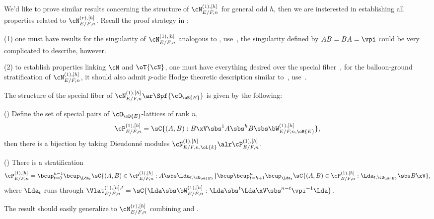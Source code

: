 \documentclass[article, a4paper, twoside]{universal}
\begin{document}
\begin{rmk}
	We'd like to prove similar results concerning the structure of $\cN_{E/F,n}^{(1),[h]}$ for general odd $h$, then we are insterested in establishing all properties related to $\cN_{E/F,n}^{(r),[h]}$. Recall the proof strategy in \cite{LRZ2024Quasi}:

	(1) one must have results for the singularity of $\cN_{E/F,n}^{(1),[h]}$ analogous to \cite[Proposition~14.2.4]{LRZ2024Quasi}, use~\cite[4.4.5]{Gortz2001}, the singularity defined by $AB=BA=\vpi$ could be very complicated to describe, however.

	(2) to establish properties linking $\cN$ and $\oT{\cN}$, one must have everything desired over the special fiber~\cite[Lemma~14.7.1]{LRZ2024Quasi}, for the balloon-ground stratification of $\cN_{E/F,n}^{(1),[h]}$, it should also admit $p$-adic Hodge theoretic description similar to~\cite[15.3]{LRZ2024Quasi}, use~\cite[Chapter~2,3]{Cho2019}.

\end{rmk}


\begin{thm}
	The structure of the special fiber of $\cN_{E/F,n}^{(1),[h]}\ar\Spf{\cO_{\oB{E}}}$ is given by the following:
	\begin{itm}
		\item (\cite[Proposition~2.4]{Cho2019}) Define the set of special pairs of $\cO_{\oB{E}}$-lattices of rank $n$,
		\[
			\cP_{E/F,n}^{(1),[h]}=\sC{(A,B):B\xV\sbs^{1}A\sbs^{h}B\sbs\bW_{E/F,n,\oB{E}}^{(1),[h]}},
		\]
		then there is a bijection by taking Dieudonn{\'e} modules $\cN_{E/F,n,\oL{k}}^{(1),[h]}\alr \cP_{E/F,n}^{(1),[h]}$.
		\item (\cite[Proposition~2.10, Proposition~2.11, Proposition~2.12]{Cho2019}) There is a stratification
		\[
			\cP_{E/F,n}^{(1),[h]}=\bcup_{t=0}^{h-1}\bcup_{\Lda_{t}}\sC{(A,B)\in\cP_{E/F,n}^{(1),[h]}:A\sbs\Lda_{t,\cO_{\oB{E}}}}\bcup\bcup_{t=h+1}^{n}\bcup_{\Lda_{t}}\sC{(A,B)\in\cP_{E/F,n}^{(1),[h]}:\Lda_{t,\cO_{\oB{E}}}\sbs B\xV},
		\]
		where $\Lda_{t}$ runs through $\Vlat_{E/F,n}^{(1),[h],t}=\sC{\Lda\sbs\bW_{E/F,n}^{(1),[h]}:\Lda\sbs^{t}\Lda\xV\sbs^{n-t}\vpi^{-1}\Lda}$.
	\end{itm}
\end{thm}

\begin{rmk}
	The result should easily generalize to $\cN_{E/F,n}^{(r),[h]}$ combining \cite[Lemma~1.5]{Vollaard2010} and \cite[Lemma~2.7]{Cho2019}.
\end{rmk}


\printref
\end{document}
